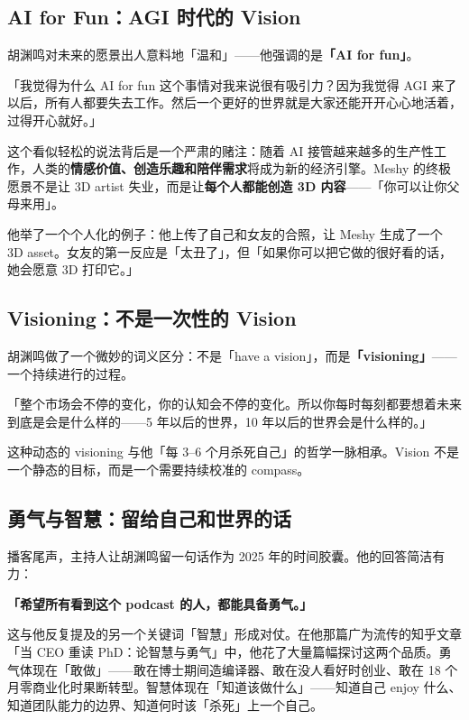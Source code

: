 \documentclass[a4paper]{article}
\begin{document}
\subsection{AI for Fun：AGI 时代的 Vision}

胡渊鸣对未来的愿景出人意料地「温和」——他强调的是\textbf{「AI for fun」}。

「我觉得为什么 AI for fun 这个事情对我来说很有吸引力？因为我觉得 AGI 来了以后，所有人都要失去工作。然后一个更好的世界就是大家还能开开心心地活着，过得开心就好。」

这个看似轻松的说法背后是一个严肃的赌注：随着 AI 接管越来越多的生产性工作，人类的\textbf{情感价值、创造乐趣和陪伴需求}将成为新的经济引擎。Meshy 的终极愿景不是让 3D artist 失业，而是让\textbf{每个人都能创造 3D 内容}——「你可以让你父母来用」。

他举了一个个人化的例子：他上传了自己和女友的合照，让 Meshy 生成了一个 3D asset。女友的第一反应是「太丑了」，但「如果你可以把它做的很好看的话，她会愿意 3D 打印它。」

\subsection{Visioning：不是一次性的 Vision}

胡渊鸣做了一个微妙的词义区分：不是「have a vision」，而是\textbf{「visioning」}——一个持续进行的过程。

「整个市场会不停的变化，你的认知会不停的变化。所以你每时每刻都要想着未来到底是会是什么样的——5 年以后的世界，10 年以后的世界会是什么样的。」

这种动态的 visioning 与他「每 3--6 个月杀死自己」的哲学一脉相承。Vision 不是一个静态的目标，而是一个需要持续校准的 compass。

\subsection{勇气与智慧：留给自己和世界的话}

播客尾声，主持人让胡渊鸣留一句话作为 2025 年的时间胶囊。他的回答简洁有力：

\textbf{「希望所有看到这个 podcast 的人，都能具备勇气。」}

这与他反复提及的另一个关键词「智慧」形成对仗。在他那篇广为流传的知乎文章「当 CEO 重读 PhD：论智慧与勇气」中，他花了大量篇幅探讨这两个品质。勇气体现在「敢做」——敢在博士期间造编译器、敢在没人看好时创业、敢在 18 个月零商业化时果断转型。智慧体现在「知道该做什么」——知道自己 enjoy 什么、知道团队能力的边界、知道何时该「杀死」上一个自己。
\end{document}
